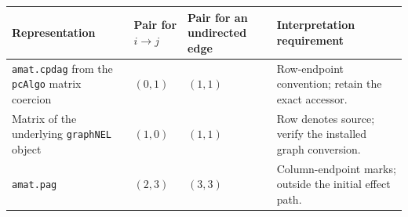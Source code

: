 \begin{longtable}[]{@{}llll@{}}
\toprule
\begin{minipage}[b]{0.22\columnwidth}\raggedright
Representation\strut
\end{minipage} & \begin{minipage}[b]{0.22\columnwidth}\raggedright
Pair for \(i\to j\)\strut
\end{minipage} & \begin{minipage}[b]{0.22\columnwidth}\raggedright
Pair for an undirected edge\strut
\end{minipage} & \begin{minipage}[b]{0.22\columnwidth}\raggedright
Interpretation requirement\strut
\end{minipage}\tabularnewline
\midrule
\endhead
\begin{minipage}[t]{0.22\columnwidth}\raggedright
\texttt{amat.cpdag} from the \texttt{pcAlgo} matrix coercion\strut
\end{minipage} & \begin{minipage}[t]{0.22\columnwidth}\raggedright
\((0,1)\)\strut
\end{minipage} & \begin{minipage}[t]{0.22\columnwidth}\raggedright
\((1,1)\)\strut
\end{minipage} & \begin{minipage}[t]{0.22\columnwidth}\raggedright
Row-endpoint convention; retain the exact accessor.\strut
\end{minipage}\tabularnewline
\begin{minipage}[t]{0.22\columnwidth}\raggedright
Matrix of the underlying \texttt{graphNEL} object\strut
\end{minipage} & \begin{minipage}[t]{0.22\columnwidth}\raggedright
\((1,0)\)\strut
\end{minipage} & \begin{minipage}[t]{0.22\columnwidth}\raggedright
\((1,1)\)\strut
\end{minipage} & \begin{minipage}[t]{0.22\columnwidth}\raggedright
Row denotes source; verify the installed graph conversion.\strut
\end{minipage}\tabularnewline
\begin{minipage}[t]{0.22\columnwidth}\raggedright
\texttt{amat.pag}\strut
\end{minipage} & \begin{minipage}[t]{0.22\columnwidth}\raggedright
\((2,3)\)\strut
\end{minipage} & \begin{minipage}[t]{0.22\columnwidth}\raggedright
\((3,3)\)\strut
\end{minipage} & \begin{minipage}[t]{0.22\columnwidth}\raggedright
Column-endpoint marks; outside the initial effect path.\strut
\end{minipage}\tabularnewline
\bottomrule
\end{longtable}

